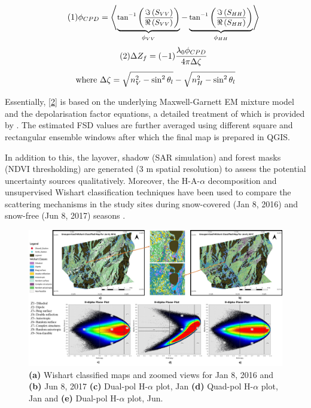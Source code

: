 \documentclass{article}
\begin{document}
\begin{equation}\tag{1}
    \centering
    \small{\phi_{CPD} =\left\langle\underbrace{\tan^{-1}\left(\frac{\Im\left(S_{VV}\right)}{\Re\left(S_{VV}\right)}\right)}_{\phi_{VV}} - \underbrace{\tan^{-1}\left(\frac{\Im\left(S_{HH}\right)}{\Re\left(S_{HH}\right)}\right)}_{\phi_{HH}}\right\rangle}
    \label{1}
\end{equation}
\begin{equation}\tag{2}
    \centering
    \small{\Delta{Z_f} = (-1)\frac{\lambda_0\phi_{CPD}}{4\pi\Delta{\zeta}}}
    \label{2}
\end{equation}
\begin{equation*}
    \centering
    \text{where } \small{\Delta{\zeta} = \sqrt{n^2_V - \sin^{2}\theta_l} - \sqrt{n^2_H - \sin^{2}\theta_l}}
\end{equation*}

Essentially, \eqref{2} is based on the underlying Maxwell-Garnett EM mixture model and the depolarisation factor equations, a detailed treatment of which is provided by \cite{Sihvola1999}. The estimated FSD values are further averaged using different square and rectangular ensemble windows after which the final map is prepared in QGIS.

In addition to this, the layover, shadow (SAR simulation) and forest masks (NDVI thresholding) are generated (3 m spatial resolution) to assess the potential uncertainty sources qualitatively. Moreover, the H-A-$\alpha$ decomposition and unsupervised Wishart classification techniques have been used to compare the scattering mechanisms in the study sites during snow-covered (Jan 8, 2016) and snow-free (Jun 8, 2017) seasons \cite{Singh2014}.
\begin{figure}[htb]
    \centering
    \includegraphics[scale=0.144]{Pictures/All_Wishart_New.jpg}
    \vspace{-4ex}
    \caption{\textbf{(a)} Wishart classified maps and zoomed views for Jan 8, 2016 and \textbf{(b)} Jun 8, 2017 \textbf{(c)} Dual-pol H-$\alpha$ plot, Jan \textbf{(d)} Quad-pol H-$\alpha$ plot, Jan and \textbf{(e)} Dual-pol H-$\alpha$ plot, Jun.}
    \label{fig:wishart}
\end{figure}
\end{document}

